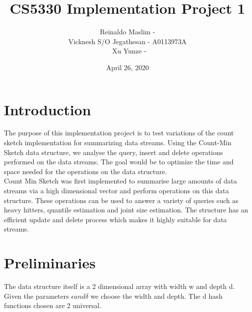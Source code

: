 \documentclass[]{report}
\begin{document}
\title{CS5330 Implementation Project 1}   
\author{Reinaldo Maslim - \\
Vicknesh S/O Jegathesan - A0113973A\\\
Xu Yunze -}
\date{April 26, 2020}   
\maketitle


\maketitle                              
                 
\tableofcontents 



            
\chapter{Introduction}                

The purpose of this implementation project is to test variations of the count sketch implementation for summarizing data streams. Using the Count-Min Sketch data structure, we analyse the query, insert and delete operations performed on the data streams. The goal would be to optimize the time and space needed for the operations on the data structure.\\

Count Min Sketch was first implemented to summarise large amounts of data streams via a high dimensional vector and perform operations on this data structure. These operations can be used to answer a variety of queries such as heavy hitters, quantile estimation and joint size estimation. The structure has an efficient update and delete process which makes it highly suitable for data streams.\\




\chapter{Preliminaries}                

The data structure itself is a 2 dimensional array with width w and depth d. Given the parameters $\epsilon and \delta$ we choose the width and depth. The d hash functions chosen are 2 universal.\\
\end{document}
